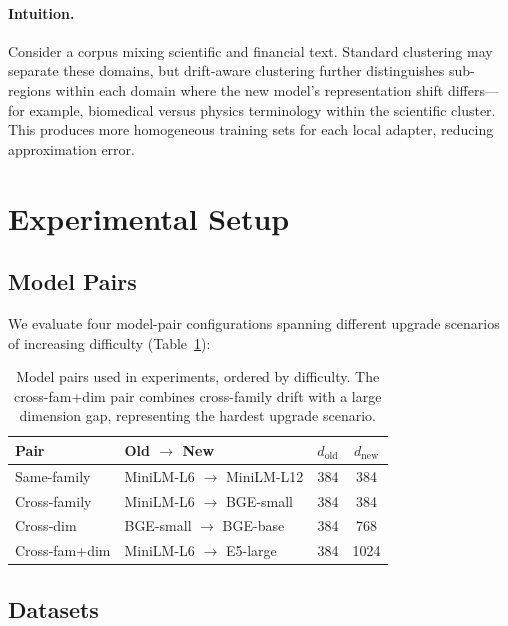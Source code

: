 \documentclass[11pt,a4paper]{article}
\begin{document}
\paragraph{Intuition.}
Consider a corpus mixing scientific and financial text.
Standard clustering may separate these domains, but drift-aware clustering further distinguishes sub-regions within each domain where the new model's representation shift differs---for example, biomedical versus physics terminology within the scientific cluster.
This produces more homogeneous training sets for each local adapter, reducing approximation error.

\section{Experimental Setup}
\label{sec:experiments}

\subsection{Model Pairs}
\label{sec:experiments:models}

We evaluate four model-pair configurations spanning different upgrade scenarios of increasing difficulty (Table~\ref{tab:model_pairs}):

\begin{table}[h]
\centering
\small
\begin{tabular}{@{}llcc@{}}
\toprule
\textbf{Pair} & \textbf{Old $\to$ New} & $d_{\mathrm{old}}$ & $d_{\mathrm{new}}$ \\
\midrule
Same-family     & MiniLM-L6 $\to$ MiniLM-L12  & 384 & 384 \\
Cross-family    & MiniLM-L6 $\to$ BGE-small    & 384 & 384 \\
Cross-dim       & BGE-small $\to$ BGE-base      & 384 & 768 \\
Cross-fam+dim   & MiniLM-L6 $\to$ E5-large      & 384 & 1024 \\
\bottomrule
\end{tabular}
\caption{Model pairs used in experiments, ordered by difficulty. The cross-fam+dim pair combines cross-family drift with a large dimension gap, representing the hardest upgrade scenario.}
\label{tab:model_pairs}
\end{table}

\subsection{Datasets}
\label{sec:experiments:datasets}
\end{document}
